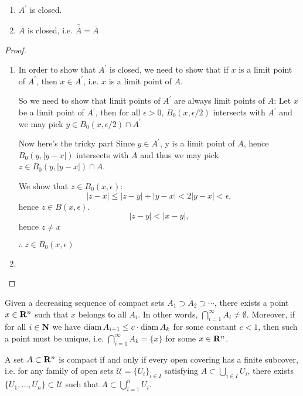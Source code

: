 \begin{proposition}
\begin{enumerate}[label=(\arabic*)]
\item $A^\prime$ is closed.
\item $\bar{A}$ is closed, i.e. $\bar{\bar{A}}=\bar{A}$
\end{enumerate}
\end{proposition}

\begin{proof} \
\begin{enumerate}[label=(\arabic*)]
\item In order to show that $A^\prime$ is closed, we need to show that if $x$ is a limit point of $A^\prime$, then $x\in A^\prime$, i.e. $x$ is a limit point of $A$.

So we need to show that limit points of $A^\prime$ are always limit points of $A$: 
Let $x$ be a limit point of $A^\prime$, then for all $\epsilon>0$, $B_0(x,\epsilon/2)$ intersects with $A^\prime$ and we may pick $y \in B_0(x,\epsilon/2)\cap A^\prime$

Now here's the tricky part
Since $y \in A^\prime$, y is a limit point of $A$, hence $B_0(y,|y-x|)$ intersects with $A$ and thus we may pick $z \in B_0(y,|y-x|)\cap A$.

We show that $z \in B_0(x,\epsilon)$:
\[ |z-x|\le|z-y|+|y-x|<2|y-x|<\epsilon, \]
hence $z \in B(x,\epsilon)$.
\[ |z-y|<|x-y|, \]
hence $z \neq x$

$\therefore\:z \in B_0(x,\epsilon)$

\item 
\end{enumerate}
\end{proof}



\begin{theorem}
Given a decreasing sequence of compact sets $A_1\supset A_2 \supset \cdots$, there exists a point $x\in\mathbf R^n$ such that $x$ belongs to all $A_i$. In other words, $\bigcap_{i=1}^\infty A_i\neq\emptyset$. Moreover, if for all $i\in\mathbf N$ we have $\operatorname{diam} A_{i+1}\le c\cdot\operatorname{diam} A_k$ for some constant $c<1$, then such a point must be unique, i.e. $\bigcap_{i=1}^\infty A_k=\{x\}$ for some $x\in\mathbf R^n$.
\end{theorem}

\begin{theorem}
A set $A\subset\mathbf R^n$ is compact if and only if every open covering has a finite subcover, i.e. for any family of open sets $\mathscr{U}=\{U_i\}_{i\in I}$ satisfying $A\subset\bigcup_{i\in I}U_i$, there exists $\{U_1,\dots,U_n\}\subset\mathscr{U}$ such that $A\subset\bigcup_{i=1}^n U_i$.
\end{theorem}

